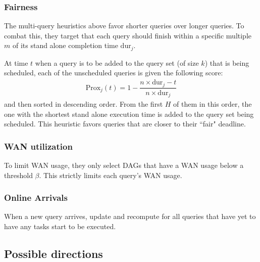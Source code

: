 \subsubsection{Fairness}

The multi-query heuristics above favor shorter queries over longer queries.
To combat this, they target that each query should finish within a specific multiple $m$ of its stand alone completion time $\text{dur}_j$.

At time $t$ when a query is to be added to the query set (of size $k$) that is being scheduled, each of the unscheduled queries is given the following score:
\begin{align}
	\text{Prox}_j(t) = 1 - \dfrac{n\times\text{dur}_j-t}{n\times\text{dur}_j}
\end{align}
and then sorted in descending order.
From the first $H$ of them in this order, the one with the shortest stand alone execution time is added to the query set being scheduled.
This heuristic favors queries that are closer to their ``fair" deadline.

\subsubsection{WAN utilization}

To limit WAN usage, they only select DAGs that have a WAN usage below a threshold $\beta$.
This strictly limits each query's WAN usage.

\subsubsection{Online Arrivals}

When a new query arrives, update and recompute for all queries that have yet to have any tasks start to be executed.

\subsection{Possible directions}

